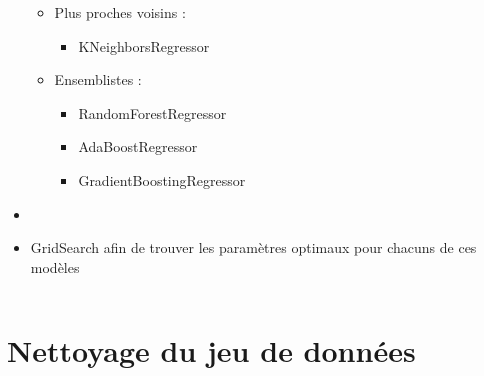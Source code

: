\documentclass[8pt,aspectratio=169,hyperref={unicode=true}]{beamer}
\begin{document}
\begin{frame}{\insertsubsection}
\begin{columns}[t]
\begin{column}{.5\textwidth}
\begin{itemize}
\begin{itemize}
                \item Plus proches voisins :
                      \begin{itemize}
                        \item KNeighborsRegressor
                      \end{itemize}
                \item Ensemblistes :
                      \begin{itemize}
                        \item RandomForestRegressor
                        \item AdaBoostRegressor
                        \item GradientBoostingRegressor
                      \end{itemize}
              \end{itemize}
        \item[]
        \item GridSearch afin de trouver les paramètres optimaux pour chacuns de ces modèles
      \end{itemize}
    \end{column}
  \end{columns}
\end{frame}

\section{Nettoyage du jeu de données}
\end{document}

